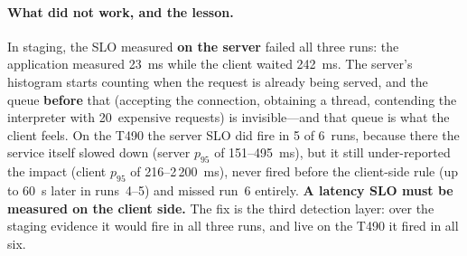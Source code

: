 \documentclass[11pt,a4paper]{article}
\begin{document}
\paragraph{What did not work, and the lesson.}
In staging, the SLO measured \textbf{on the server} failed all three runs: the application
measured 23~ms while the client waited 242~ms. The server's histogram starts counting when the
request is already being served, and the queue \textbf{before} that (accepting the
connection, obtaining a thread, contending the interpreter with 20~expensive requests) is
invisible---and that queue is what the client feels. On the T490 the server SLO did fire in
5 of 6~runs, because there the service itself slowed down (server $p_{95}$ of 151--495~ms),
but it still under-reported the impact (client $p_{95}$ of 216--2\,200~ms), never fired
before the client-side rule (up to 60~s later in runs~4--5) and missed run~6 entirely.
\textbf{A latency SLO must be measured on the client side.} The fix is the third detection
layer: over the staging evidence it would fire in all three runs, and live on the T490 it
fired in all six.
\end{document}
